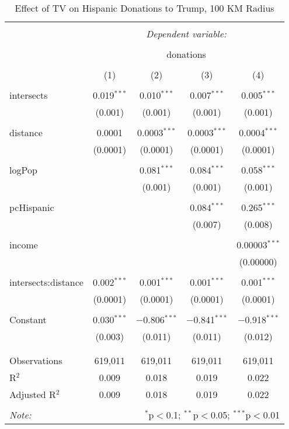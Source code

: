 
\begin{table}[!htbp] \centering 
  \caption{Effect of TV on Hispanic Donations to Trump, 100 KM Radius} 
  \label{} 
\begin{tabular}{@{\extracolsep{-5pt}}lcccc} 
\\[-1.8ex]\hline 
\hline \\[-1.8ex] 
 & \multicolumn{4}{c}{\textit{Dependent variable:}} \\ 
\cline{2-5} 
\\[-1.8ex] & \multicolumn{4}{c}{donations} \\ 
\\[-1.8ex] & (1) & (2) & (3) & (4)\\ 
\hline \\[-1.8ex] 
 intersects & 0.019$^{***}$ & 0.010$^{***}$ & 0.007$^{***}$ & 0.005$^{***}$ \\ 
  & (0.001) & (0.001) & (0.001) & (0.001) \\ 
  & & & & \\ 
 distance & 0.0001 & 0.0003$^{***}$ & 0.0003$^{***}$ & 0.0004$^{***}$ \\ 
  & (0.0001) & (0.0001) & (0.0001) & (0.0001) \\ 
  & & & & \\ 
 logPop &  & 0.081$^{***}$ & 0.084$^{***}$ & 0.058$^{***}$ \\ 
  &  & (0.001) & (0.001) & (0.001) \\ 
  & & & & \\ 
 pcHispanic &  &  & 0.084$^{***}$ & 0.265$^{***}$ \\ 
  &  &  & (0.007) & (0.008) \\ 
  & & & & \\ 
 income &  &  &  & 0.00003$^{***}$ \\ 
  &  &  &  & (0.00000) \\ 
  & & & & \\ 
 intersects:distance & 0.002$^{***}$ & 0.001$^{***}$ & 0.001$^{***}$ & 0.001$^{***}$ \\ 
  & (0.0001) & (0.0001) & (0.0001) & (0.0001) \\ 
  & & & & \\ 
 Constant & 0.030$^{***}$ & $-$0.806$^{***}$ & $-$0.841$^{***}$ & $-$0.918$^{***}$ \\ 
  & (0.003) & (0.011) & (0.011) & (0.012) \\ 
  & & & & \\ 
\hline \\[-1.8ex] 
Observations & 619,011 & 619,011 & 619,011 & 619,011 \\ 
R$^{2}$ & 0.009 & 0.018 & 0.019 & 0.022 \\ 
Adjusted R$^{2}$ & 0.009 & 0.018 & 0.019 & 0.022 \\ 
\hline 
\hline \\[-1.8ex] 
\textit{Note:}  & \multicolumn{4}{r}{$^{*}$p$<$0.1; $^{**}$p$<$0.05; $^{***}$p$<$0.01} \\ 
\end{tabular} 
\end{table} 
